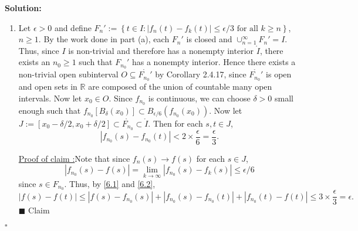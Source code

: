 \documentclass[12pt]{article}
\newcounter{ProofCounter}
\newcounter{ClaimCounter}[ProofCounter]
\newenvironment{Solution}{\stepcounter{ProofCounter}\textbf{Solution:}}{\hfill$\square$}
\newenvironment{claim}[1]{\vspace{1mm}\stepcounter{ClaimCounter}\par\noindent\underline{\bf Claim \theClaimCounter:}\space#1}{}
\newenvironment{claimproof}[1]{\par\noindent\underline{Proof of claim \theClaimCounter:}\space#1}{\hfill $\blacksquare$ Claim \theClaimCounter}
\begin{document}
\begin{Solution}
\begin{enumerate}
\begin{enumerate}
        \item Let $\epsilon > 0$ and define $F_n' := \left\{ t \in I: |f_n(t) - f_k(t)| \leq \epsilon / 3 \text{ for all } k \geq n \right\}$, $n\geq
          1$.
          By the work done in part (a), each $F_n'$ is closed and $\cup_{n=1}^{\infty}F_n' = I$. Thus, since $I$ is non-trivial and therefore has a
          nonempty interior $\mathring{I}$, there exists an $n_0 \geq 1$ such that $F_{n_0}'$ has a nonempty interior. Hence there exists a
          non-trivial open subinterval $O \subseteq \mathring{F_{n_0}'}$ by Corollary 2.4.17, since $\mathring{F_{n_0}'}$ is open and open sets in
          $\mathbb{R}$ are composed of
          the union of countable many open intervals. Now let $x_0 \in O$. 
          Since $f_{n_0}$ is continuous, we can choose $\delta > 0$ small enough such that $f_{n_0}[B_{\delta}(x_0)] \subset B_{\epsilon / 6}(f_{n_0}(x_0))$.
          Now let $J := [x_0 - \delta / 2, x_0 + \delta / 2] \subset \mathring{F_{n_0}} \subset \mathring{I}$. Then for each $s, t \in J$,
          \begin{equation}
            |f_{n_0}(s) - f_{n_0}(t)| < 2\times \frac{\epsilon}{6} = \frac{\epsilon}{3}.
            \label{6.1}
          \end{equation}

          \begin{claimproof}
            Note that since $f_{n}(s) \rightarrow f(s)$ for each $s \in J$, 
            \begin{equation}
              |f_{n_0}(s) - f(s)| = \lim_{k\rightarrow\infty}|f_{n_0}(s) - f_{k}(s)| \leq \epsilon / 6
              \label{6.2}
            \end{equation}
            since $s \in F_{n_{0}}$. Thus, by \eqref{6.1} and \eqref{6.2},
            \[
              |f(s) - f(t)| \leq |f(s) - f_{n_0}(s)| + |f_{n_0}(s) - f_{n_0}(t)| + |f_{n_0}(t) - f(t)| \leq 3\times \frac{\epsilon}{3} =
              \epsilon.
            \]
          \end{claimproof}


\end{enumerate}
\end{enumerate}
\end{Solution}
\end{document}
